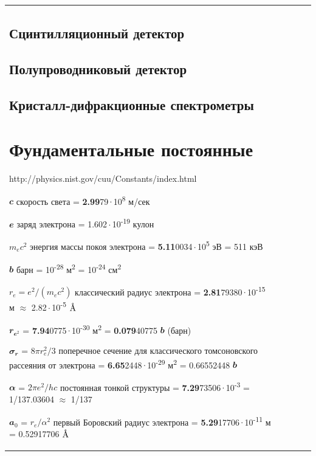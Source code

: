 \documentclass[a4paper,14pt, openany, twoside, draft]{extbook} %
\newcommand{\AAA}{\textup{\AA}}
\begin{document}
\begin{flushleft}
\begin{supertabular}{|m{1.7279999cm}|m{1.522cm}|m{1.522cm}|m{1.522cm}|m{1.744cm}|}
\section{Сцинтилляционный детектор}
\section{Полупроводниковый детектор}
\section{Кристалл-дифракционные спектрометры}

\newpage
\chapter*{Фундаментальные постоянные}
{http://physics.nist.gov/cuu/Constants/index.html}


$\mathbfit{c}$  скорость света =  \textbf{2.99}79\,$\cdot$\,10\textsuperscript{8} м/сек %

$\mathbfit{e}$  заряд электрона = 1.602\,$\cdot$\,10\textsuperscript{-19} кулон

$m_ec^2$  энергия массы покоя электрона = \textbf{5.11}0034\,$\cdot$\,10\textsuperscript{5} эВ = 511 кэВ

$\mathbfit{b}$  барн = 10\textsuperscript{-28} м\textsuperscript{2} = 10\textsuperscript{-24} см\textsuperscript{2}

$r_e=e^2/(m_ec^2)$  классический радиус электрона = \textbf{2.81}79380\,$\cdot$\,10\textsuperscript{-15} м $\approx$ 2.82\,$\cdot$\,10\textsuperscript{-5} $\AAA$

$\mathbfit{r_{e^2}}$ = \textbf{7.94}0775\,$\cdot$\,10\textsuperscript{-30} м\textsuperscript{2}  = \textbf{0.079}40775 $\mathbfit{b}$ (барн)

$\mathbfit{\sigma_r}$ = $8\pi r_e^2/3$ поперечное сечение для классического томсоновского рассеяния от электрона = \textbf{6.65}2448\,$\cdot$\,10\textsuperscript{-29} м\textsuperscript{2} = 0.66552448 $\mathbfit{b}$

$\mathbfit{\alpha}$ = $2\pi e^2/hc$ постоянная тонкой структуры = \textbf{7.29}73506\,$\cdot$\,10\textsuperscript{-3} = 1/137.03604 $\approx$ 1/137

$\mathbfit{a_0}$ = $r_e/\alpha^2$ первый Боровский радиус электрона  = \textbf{5.29}17706\,$\cdot$\,10\textsuperscript{-11} м = 0.52917706 $\AAA$


\end{supertabular}
\end{flushleft}
\end{document}
